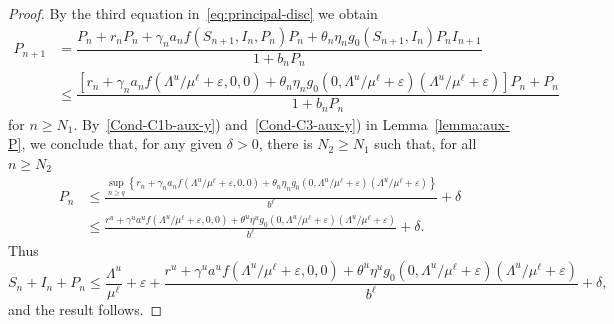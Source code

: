 \documentclass[reqno]{amsart}
\renewcommand{\le}{\leqslant}
\renewcommand{\ge}{\geqslant}
\newcommand{\eps}{\varepsilon}
\begin{document}
{{\begin{proof}
By the third equation in~\eqref{eq:principal-disc} we obtain
\[
\begin{split}
P_{n+1}
& =\dfrac{P_n+r_nP_n+\gamma_n a_nf(S_{n+1},I_n,P_n)P_n+\theta_n\eta_ng_0(S_{n+1},I_n)P_nI_{n+1}}{1+b_nP_n}\\
& \le \dfrac{\left[r_n+\gamma_n a_n f(\Lambda^u/\mu^\ell+\eps,0,0)+\theta_n\eta_n g_0(0,\Lambda^u/\mu^\ell+\eps)(\Lambda^u/\mu^\ell+\eps)\right]P_n+P_n}{1+b_nP_n}
\end{split}
\]
for $n \ge N_1$. By~\ref{Cond-C1b-aux-y}) and~\ref{Cond-C3-aux-y}) in Lemma~\ref{lemma:aux-P}, we conclude that, for any given $\delta>0$, there is $N_2 \ge N_1$ such that, for all $n \ge N_2$
\[
\begin{split}
P_n
& \le \frac{\sup_{n \ge q}\left\{r_n+\gamma_n a_n f(\Lambda^u/\mu^\ell+\eps,0,0)+\theta_n\eta_n g_0(0,\Lambda^u/\mu^\ell+\eps)(\Lambda^u/\mu^\ell+\eps)\right\}}{b^\ell}+\delta\\
& \le \frac{r^u+\gamma^u a^u f(\Lambda^u/\mu^\ell+\eps,0,0)+\theta^u \eta^u g_0(0,\Lambda^u/\mu^\ell+\eps)(\Lambda^u/\mu^\ell+\eps)}{b^\ell}+\delta.
\end{split}
\]
Thus
\[
S_n+I_n+P_n \le \frac{\Lambda^u}{\mu^\ell}+\eps+\frac{r^u+\gamma^u a^u f(\Lambda^u/\mu^\ell+\eps,0,0)+\theta^u \eta^u g_0(0,\Lambda^u/\mu^\ell+\eps)(\Lambda^u/\mu^\ell+\eps)}{b^\ell}+\delta,
\]
and the result follows.
\end{proof}

}}
\end{document}

